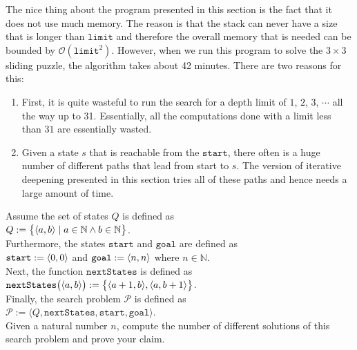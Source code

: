 The nice thing about the program presented in this section is the fact that it does not use much
memory.  The reason is that the stack can never have a size that is longer than $\mathtt{limit}$ and
therefore the overall memory that is needed can be bounded by $\mathcal{O}(\mathtt{limit}^2)$.
However, when we run this program to solve the $3 \times 3$ sliding puzzle, the algorithm takes
about 42 minutes.  There are two reasons for this:
\begin{enumerate}
\item First, it is quite wasteful to run the search for a depth limit of $1$, $2$, $3$, $\cdots$ all the way up
      to 31.  Essentially, all the computations done with a limit less than $31$ are essentially wasted.
\item Given a state $s$ that is reachable from the $\mathtt{start}$, there often is a huge number of
      different paths that lead from start to $s$.  The version of iterative deepening presented in
      this section tries all of these paths and hence needs a large amount of time.
\end{enumerate}

\exercise
Assume the set of states $Q$ is defined as
\\[0.2cm]
\hspace*{1.3cm}
$Q := \bigl\{ \pair(a, b) \mid a \in \mathbb{N} \wedge b \in \mathbb{N} \bigr\}$.
\\[0.2cm]
Furthermore, the states $\mathtt{start}$ and $\mathtt{goal}$ are defined as
\\[0.2cm]
\hspace*{1.3cm}
$\mathtt{start} := \pair(0,0)$ \quad and \quad $\mathtt{goal} := \pair(n,n)$ where $n \in \mathbb{N}$.
\\[0.2cm]
Next, the function $\mathtt{nextStates}$ is defined as
\\[0.2cm]
\hspace*{1.3cm}
$\mathtt{nextStates}\bigl(\pair(a,b)\bigr) := \bigl\{\pair(a+1,b), \pair(a,b+1)\bigr\}$.
\\[0.2cm]
Finally, the search problem $\mathcal{P}$ is defined as
\\[0.2cm]
\hspace*{1.3cm}
$\mathcal{P} := \langle Q, \mathtt{nextStates}, \mathtt{start}, \mathtt{goal} \rangle$.
\\[0.2cm]
Given a natural number $n$, compute the number of different solutions of this search problem and prove
your claim.
\eoxs

